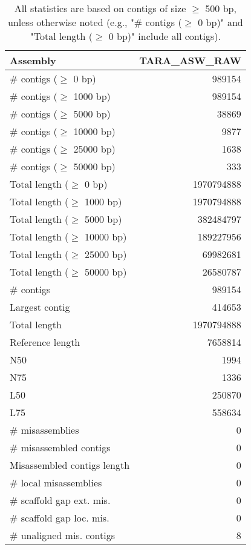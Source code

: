 \documentclass[12pt,a4paper]{article}
\begin{document}
\begin{table}[ht]
\begin{center}
\caption{All statistics are based on contigs of size $\geq$ 500 bp, unless otherwise noted (e.g., "\# contigs ($\geq$ 0 bp)" and "Total length ($\geq$ 0 bp)" include all contigs).}
\begin{tabular}{|l*{1}{|r}|}
\hline
Assembly & TARA\_ASW\_RAW \\ \hline
\# contigs ($\geq$ 0 bp) & 989154 \\ \hline
\# contigs ($\geq$ 1000 bp) & 989154 \\ \hline
\# contigs ($\geq$ 5000 bp) & 38869 \\ \hline
\# contigs ($\geq$ 10000 bp) & 9877 \\ \hline
\# contigs ($\geq$ 25000 bp) & 1638 \\ \hline
\# contigs ($\geq$ 50000 bp) & 333 \\ \hline
Total length ($\geq$ 0 bp) & 1970794888 \\ \hline
Total length ($\geq$ 1000 bp) & 1970794888 \\ \hline
Total length ($\geq$ 5000 bp) & 382484797 \\ \hline
Total length ($\geq$ 10000 bp) & 189227956 \\ \hline
Total length ($\geq$ 25000 bp) & 69982681 \\ \hline
Total length ($\geq$ 50000 bp) & 26580787 \\ \hline
\# contigs & 989154 \\ \hline
Largest contig & 414653 \\ \hline
Total length & 1970794888 \\ \hline
Reference length & 7658814 \\ \hline
N50 & 1994 \\ \hline
N75 & 1336 \\ \hline
L50 & 250870 \\ \hline
L75 & 558634 \\ \hline
\# misassemblies & 0 \\ \hline
\# misassembled contigs & 0 \\ \hline
Misassembled contigs length & 0 \\ \hline
\# local misassemblies & 0 \\ \hline
\# scaffold gap ext. mis. & 0 \\ \hline
\# scaffold gap loc. mis. & 0 \\ \hline
\# unaligned mis. contigs & 8 \\ \hline

\end{tabular}
\end{center}
\end{table}
\end{document}
